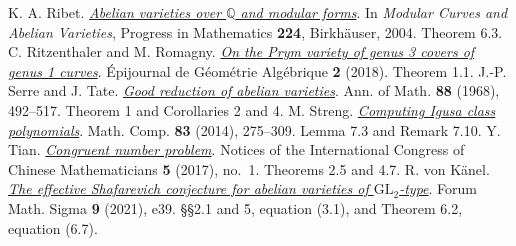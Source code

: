 \documentclass[10pt,a4paper]{article}
\newcommand{\Q}{\mathbb Q}\newcommand{\Z}{\mathbb Z}\newcommand{\N}{\mathbb N}\newcommand{\C}{\mathbb C}
\newcommand{\paperlink}[2]{\href{#1}{\textit{#2}}}
\begin{document}
\begin{thebibliography}{99}
 K. A. Ribet. \paperlink{https://math.berkeley.edu/~ribet/Articles/korea.pdf}{Abelian varieties over \(\Q\) and modular forms}. In \emph{Modular Curves and Abelian Varieties}, Progress in Mathematics \textbf{224}, Birkhäuser, 2004. Theorem 6.3.
 C. Ritzenthaler and M. Romagny. \paperlink{https://doi.org/10.46298/epiga.2018.volume2.3663}{On the Prym variety of genus 3 covers of genus 1 curves}. Épijournal de Géométrie Algébrique \textbf{2} (2018). Theorem 1.1.
 J.-P. Serre and J. Tate. \paperlink{https://wstein.org/papers/bib/Serre-Tate-Good_Reduction_of_Abelian_Varieties.pdf}{Good reduction of abelian varieties}. Ann. of Math. \textbf{88} (1968), 492--517. Theorem 1 and Corollaries 2 and 4.
 M. Streng. \paperlink{https://doi.org/10.1090/S0025-5718-2013-02712-3}{Computing Igusa class polynomials}. Math. Comp. \textbf{83} (2014), 275--309. Lemma 7.3 and Remark 7.10.
 Y. Tian. \paperlink{https://intlpress.com/site/pub/files/_fulltext/journals/iccm/2017/0005/0001/ICCM-2017-0005-0001-a003.pdf}{Congruent number problem}. Notices of the International Congress of Chinese Mathematicians \textbf{5} (2017), no.~1. Theorems 2.5 and 4.7.
 R. von Känel. \paperlink{https://doi.org/10.1017/fms.2021.29}{The effective Shafarevich conjecture for abelian varieties of \(\mathrm{GL}_2\)-type}. Forum Math. Sigma \textbf{9} (2021), e39. §§2.1 and 5, equation (3.1), and Theorem 6.2, equation (6.7).
\end{thebibliography}
\end{document}
